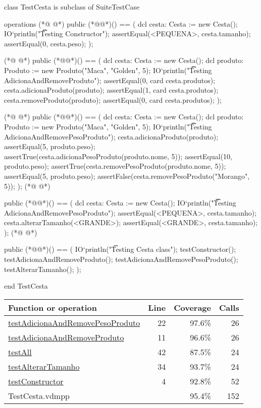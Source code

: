 \begin{vdmpp}[breaklines=true]
class TestCesta is subclass of SuiteTestCase

operations
(*@
\label{testConstructor:4}
@*)
  public (*@@*)() == (
   dcl cesta: Cesta := new Cesta();
    IO`println("\t\t Testing Constructor");
    assertEqual(<PEQUENA>, cesta.tamanho);
    assertEqual(0, cesta.peso);
  );
  
(*@
\label{testAdicionaAndRemoveProduto:11}
@*)
  public (*@@*)() == (
   dcl cesta: Cesta := new Cesta();
   dcl produto: Produto := new Produto("Maca", "Golden", 5);
   IO`println("\t\t Testing AdicionaAndRemoveProduto");
   assertEqual(0, card cesta.produtos); 
   cesta.adicionaProduto(produto);
   assertEqual(1, card cesta.produtos);  
   cesta.removeProduto(produto);
   assertEqual(0, card cesta.produtos);  
  );
  
(*@
\label{testAdicionaAndRemovePesoProduto:22}
@*)
  public (*@@*)() == (
   dcl cesta: Cesta := new Cesta();
   dcl produto: Produto := new Produto("Maca", "Golden", 5);
  IO`println("\t\t Testing AdicionaAndRemovePesoProduto");
  cesta.adicionaProduto(produto);
  assertEqual(5, produto.peso);  
  assertTrue(cesta.adicionaPesoProduto(produto.nome, 5));
  assertEqual(10, produto.peso);  
  assertTrue(cesta.removePesoProduto(produto.nome, 5));
  assertEqual(5, produto.peso);  
  assertFalse(cesta.removePesoProduto("Morango", 5));
  );
(*@
\label{testAlterarTamanho:34}
@*)
  
  public (*@@*)() == (
   dcl cesta: Cesta := new Cesta();
  IO`println("\t\t Testing AdicionaAndRemovePesoProduto");
  assertEqual(<PEQUENA>, cesta.tamanho);
  cesta.alterarTamanho(<GRANDE>);
  assertEqual(<GRANDE>, cesta.tamanho);
  );
(*@
\label{testAll:42}
@*)

  public (*@@*)() == (
    IO`println("\t Testing Cesta class");
    testConstructor();
    testAdicionaAndRemoveProduto();
    testAdicionaAndRemovePesoProduto();
    testAlterarTamanho();
  );

end TestCesta
\end{vdmpp}
\bigskip
\begin{longtable}{|l|r|r|r|}
\hline
Function or operation & Line & Coverage & Calls \\
\hline
\hline
\hyperref[testAdicionaAndRemovePesoProduto:22]{testAdicionaAndRemovePesoProduto} & 22&97.6\% & 26 \\
\hline
\hyperref[testAdicionaAndRemoveProduto:11]{testAdicionaAndRemoveProduto} & 11&96.6\% & 26 \\
\hline
\hyperref[testAll:42]{testAll} & 42&87.5\% & 24 \\
\hline
\hyperref[testAlterarTamanho:34]{testAlterarTamanho} & 34&93.7\% & 24 \\
\hline
\hyperref[testConstructor:4]{testConstructor} & 4&92.8\% & 52 \\
\hline
\hline
TestCesta.vdmpp & & 95.4\% & 152 \\
\hline
\end{longtable}

